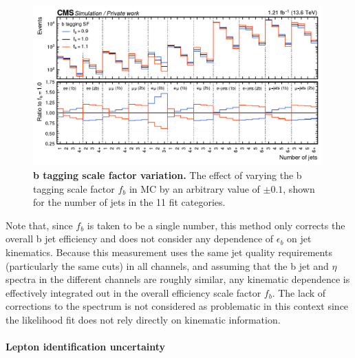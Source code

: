 \begin{figure}[ht]
    \centering
    \includegraphics[width=0.99\textwidth]{figures/ttxs/scalefactors/btagsf.pdf}
    \caption{
       \textbf{b tagging scale factor variation.} The effect of varying the b tagging scale factor $f_b$ in \ttbar MC by an arbitrary value of $\pm 0.1$, shown for the number of jets in the 11 fit categories.
    }
    \label{fig:ttxs:btagsf}
\end{figure}

Note that, since $f_b$ is taken to be a single number, this method only corrects the overall b jet efficiency and does not consider any dependence of $\epsilon_b$ on jet kinematics. Because this measurement uses the same jet quality requirements (particularly the same \pt cuts) in all channels, and assuming that the b jet \pt and $\eta$ spectra in the different channels are roughly similar, any kinematic dependence is effectively integrated out in the overall efficiency scale factor $f_b$. %
The lack of corrections to the spectrum is not considered as problematic in this context since the likelihood fit does not rely directly on kinematic information.

\paragraph{Lepton identification uncertainty}


